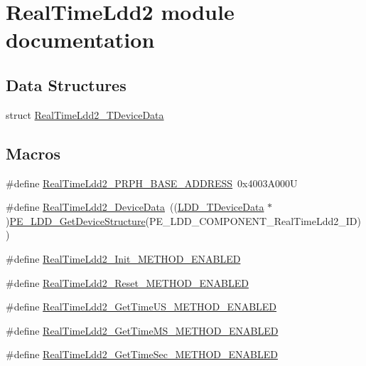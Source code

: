\hypertarget{group___real_time_ldd2__module}{\section{Real\-Time\-Ldd2 module documentation}
\label{group___real_time_ldd2__module}
}
\subsection*{Data Structures}
\begin{DoxyCompactItemize}
\item 
struct \hyperlink{struct_real_time_ldd2___t_device_data}{Real\-Time\-Ldd2\-\_\-\-T\-Device\-Data}
\end{DoxyCompactItemize}
\subsection*{Macros}
\begin{DoxyCompactItemize}
\item 
\#define \hyperlink{group___real_time_ldd2__module_gaf7beb45a4424df4da43f3b45c78a6652}{Real\-Time\-Ldd2\-\_\-\-P\-R\-P\-H\-\_\-\-B\-A\-S\-E\-\_\-\-A\-D\-D\-R\-E\-S\-S}~0x4003\-A000\-U
\item 
\#define \hyperlink{group___real_time_ldd2__module_ga368e4a6b140bc3df3e6e9fd64fc994ce}{Real\-Time\-Ldd2\-\_\-\-Device\-Data}~((\hyperlink{group___p_e___types__module_gac5cf1362f1f0e3a2ce71b1bf2276d091}{L\-D\-D\-\_\-\-T\-Device\-Data} $\ast$)\hyperlink{group___p_e___types__module_gaa1c23d559daef5bcd3327ca83fb56f5a}{P\-E\-\_\-\-L\-D\-D\-\_\-\-Get\-Device\-Structure}(P\-E\-\_\-\-L\-D\-D\-\_\-\-C\-O\-M\-P\-O\-N\-E\-N\-T\-\_\-\-Real\-Time\-Ldd2\-\_\-\-I\-D))
\item 
\#define \hyperlink{group___real_time_ldd2__module_gafe6afc8bcc1aef4a8d7dc6ecb2793431}{Real\-Time\-Ldd2\-\_\-\-Init\-\_\-\-M\-E\-T\-H\-O\-D\-\_\-\-E\-N\-A\-B\-L\-E\-D}
\item 
\#define \hyperlink{group___real_time_ldd2__module_gaa65175b17bf9ee0d111e971783181cdb}{Real\-Time\-Ldd2\-\_\-\-Reset\-\_\-\-M\-E\-T\-H\-O\-D\-\_\-\-E\-N\-A\-B\-L\-E\-D}
\item 
\#define \hyperlink{group___real_time_ldd2__module_ga3db29bed456a7f7b95a03acc4c6956ed}{Real\-Time\-Ldd2\-\_\-\-Get\-Time\-U\-S\-\_\-\-M\-E\-T\-H\-O\-D\-\_\-\-E\-N\-A\-B\-L\-E\-D}
\item 
\#define \hyperlink{group___real_time_ldd2__module_gaab7097d73e29dae25e5a1c2e283c1e2c}{Real\-Time\-Ldd2\-\_\-\-Get\-Time\-M\-S\-\_\-\-M\-E\-T\-H\-O\-D\-\_\-\-E\-N\-A\-B\-L\-E\-D}
\item 
\#define \hyperlink{group___real_time_ldd2__module_ga1535acdd92817c52bf81591f3d41aeb0}{Real\-Time\-Ldd2\-\_\-\-Get\-Time\-Sec\-\_\-\-M\-E\-T\-H\-O\-D\-\_\-\-E\-N\-A\-B\-L\-E\-D}
\end{DoxyCompactItemize}
